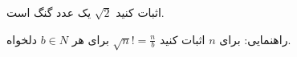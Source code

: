 \begin{PROBLEM}
	\p
	اثبات کنید
	$\sqrt{2}$
	یک عدد گنگ است.

	راهنمایی: برای 
	$n$
	اثبات کنید 
	$\sqrt{n} != \frac{n}{b}$
	برای هر 
	$b \in N$
	دلخواه. 
	\SOLUTION{
		\p
		
	}
\end{PROBLEM}